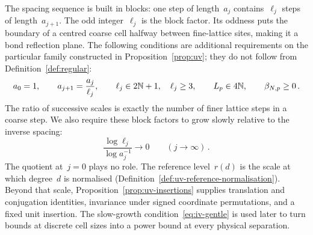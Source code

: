 The spacing sequence is built in blocks: one step of length~$a_j$ contains~$\ell_j$ steps of length~$a_{j+1}$. The odd integer~$\ell_j$ is the block factor. Its oddness puts the boundary of a centred coarse cell halfway between fine-lattice sites, making it a bond reflection plane. The following conditions are additional requirements on the particular family constructed in Proposition~\ref{prop:uv}; they do not follow from Definition~\ref{def:regular}:
\begin{equation}\label{eq:iv-scales}
 a_0=1,\qquad a_{j+1}=\frac{a_j}{\ell_j},\qquad
 \ell_j\in2\mathbb N+1,\quad \ell_j\ge3,\qquad L_p\in4\mathbb N,\qquad \beta_{N,p}\ge0\,.
\end{equation}
The ratio of successive scales is exactly the number of finer lattice steps in a coarse step.
We also require these block factors to grow slowly relative to the inverse spacing:
\begin{equation}\label{eq:iv-gentle}
\frac{\log\ell_j}{\log a_j^{-1}}\longrightarrow0\qquad(j\longrightarrow\infty)\,.
\end{equation}
The quotient at~$j=0$ plays no role.
The reference level~$r(d)$ is the scale at which degree~$d$ is normalised (Definition~\ref{def:uv-reference-normalisation}). Beyond that scale, Proposition~\ref{prop:uv-insertions} supplies translation and conjugation identities, invariance under signed coordinate permutations, and a fixed unit insertion. The slow-growth condition~\eqref{eq:iv-gentle} is used later to turn bounds at discrete cell sizes into a power bound at every physical separation.

